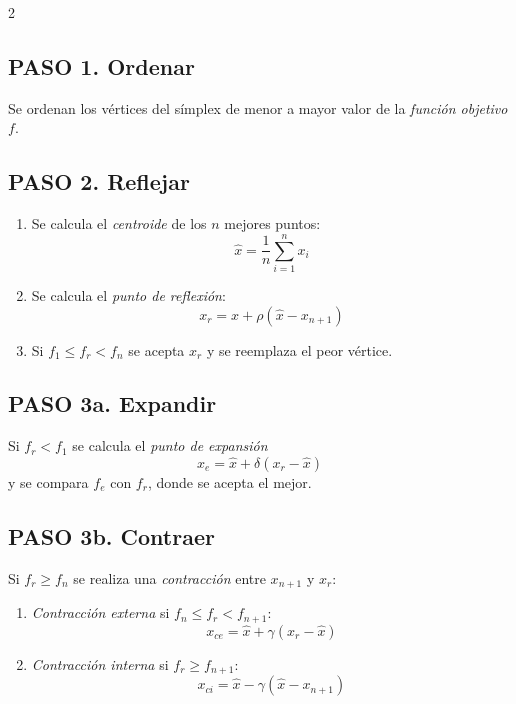 \documentclass[a4paper, 9pt]{article}
\begin{document}
\begin{multicols}{2}
            \subsection*{PASO 1. Ordenar}
            
            Se ordenan los vértices del símplex de menor a mayor valor de la \textit{función objetivo} $f$.
            
            \subsection*{PASO 2. Reflejar}
            
            \begin{enumerate}
                \item Se calcula el \textit{centroide} de los $n$ mejores puntos: \[\hat{x}=\frac{1}{n}\sum_{i=1}^{n} x_i\]
                \item Se calcula el \textit{punto de reflexión}: \[x_r=\hat{x} + \rho (\hat{x}-x_{n+1})\]
                \item Si $f_1 \leq f_r < f_n$ se acepta $x_r$ y se reemplaza el peor vértice.
            \end{enumerate}
            
            \subsection*{PASO 3a. Expandir}
            
            Si $f_r < f_1$ se calcula el \textit{punto de expansión}  \[x_e=\hat{x} + \delta(x_r-\hat{x})\]
            y se compara $f_e$ con $f_r$, donde se acepta el mejor.
            
            \subsection*{PASO 3b. Contraer}
            
            Si $f_r \geq f_n$ se realiza una \textit{contracción} entre $x_{n+1}$ y $x_r$:
            
            \begin{enumerate}
                \item \textit{Contracción externa} si $f_n \leq f_r < f_{n+1}$: \[ x_{ce} = \hat{x} + \gamma(x_r-\hat{x})\]
                \item \textit{Contracción interna} si $f_r \geq f_{n+1}$: \[x_{ci} = \hat{x} - \gamma(\hat{x}-x_{n+1})\]
            \end{enumerate}
            

\end{multicols}
\end{document}
